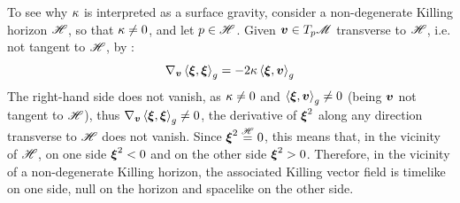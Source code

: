 To see why $ \kappa $ is interpreted as a surface gravity, consider a non-degenerate Killing horizon $ \mathscr{H} $, so that $ \kappa \neq 0 $, and let $ p \in \mathscr{H} $. Given $ \boldsymbol{v} \in T_p\mathscr{M} $ transverse to $ \mathscr{H} $, i.e. not tangent to $ \mathscr{H} $, by :
\begin{equation*}
  \nabla_{\boldsymbol{v}} \braket{\boldsymbol{\xi} , \boldsymbol{\xi}}_g = - 2 \kappa \braket{\boldsymbol{\xi} , \boldsymbol{v}}_g
\end{equation*}
The right-hand side does not vanish, as $ \kappa \neq 0 $ and $ \braket{\boldsymbol{\xi} , \boldsymbol{v}}_g \neq 0 $ (being $ \boldsymbol{v} $ not tangent to $ \mathscr{H} $), thus $ \nabla_{\boldsymbol{v}} \braket{\boldsymbol{\xi} , \boldsymbol{\xi}}_g \neq 0 $, the derivative of $ \boldsymbol{\xi}^2 $ along any direction transverse to $ \mathscr{H} $ does not vanish. Since $ \boldsymbol{\xi}^2 \overset{\mathscr{H}}{=} 0 $, this means that, in the vicinity of $ \mathscr{H} $, on one side $ \boldsymbol{\xi}^2 < 0 $ and on the other side $ \boldsymbol{\xi}^2 > 0 $. Therefore, in the vicinity of a non-degenerate Killing horizon, the associated Killing vector field is timelike on one side, null on the horizon and spacelike on the other side.

